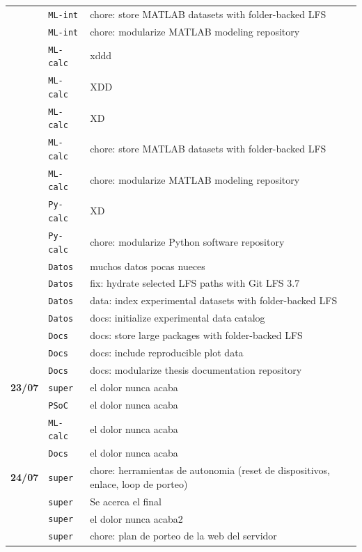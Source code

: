 \begin{longtable}{@{}p{1.7cm} p{1.5cm} p{12.2cm}@{}}
 & \texttt{\scriptsize ML-int} & chore: store MATLAB datasets with folder-backed LFS \\
 & \texttt{\scriptsize ML-int} & chore: modularize MATLAB modeling repository \\
 & \texttt{\scriptsize ML-calc} & xddd \\
 & \texttt{\scriptsize ML-calc} & XDD \\
 & \texttt{\scriptsize ML-calc} & XD \\
 & \texttt{\scriptsize ML-calc} & chore: store MATLAB datasets with folder-backed LFS \\
 & \texttt{\scriptsize ML-calc} & chore: modularize MATLAB modeling repository \\
 & \texttt{\scriptsize Py-calc} & XD \\
 & \texttt{\scriptsize Py-calc} & chore: modularize Python software repository \\
 & \texttt{\scriptsize Datos} & muchos datos pocas nueces \\
 & \texttt{\scriptsize Datos} & fix: hydrate selected LFS paths with Git LFS 3.7 \\
 & \texttt{\scriptsize Datos} & data: index experimental datasets with folder-backed LFS \\
 & \texttt{\scriptsize Datos} & docs: initialize experimental data catalog \\
 & \texttt{\scriptsize Docs} & docs: store large packages with folder-backed LFS \\
 & \texttt{\scriptsize Docs} & docs: include reproducible plot data \\
 & \texttt{\scriptsize Docs} & docs: modularize thesis documentation repository \\
\textbf{23/07} & \texttt{\scriptsize super} & el dolor nunca acaba \\
 & \texttt{\scriptsize PSoC} & el dolor nunca acaba \\
 & \texttt{\scriptsize ML-calc} & el dolor nunca acaba \\
 & \texttt{\scriptsize Docs} & el dolor nunca acaba \\
\textbf{24/07} & \texttt{\scriptsize super} & chore: herramientas de autonomia (reset de dispositivos, enlace, loop de porteo) \\
 & \texttt{\scriptsize super} & Se acerca el final \\
 & \texttt{\scriptsize super} & el dolor nunca acaba2 \\
 & \texttt{\scriptsize super} & chore: plan de porteo de la web del servidor \\

\end{longtable}

